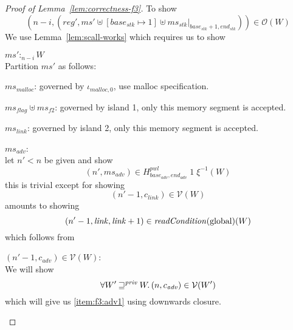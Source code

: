 \documentclass[a4paper]{article}
\newcommand{\var}[1]{\mathit{#1}}
\newcommand{\hs}{\var{ms}}
\newcommand{\ms}{\hs}
\newcommand{\start}{\var{base}}
\newcommand{\addrend}{\var{end}}
\newcommand{\reg}{\var{reg}}
\newcommand{\heap}{\var{mem}}
\newcommand{\adv}{\var{adv}}
\newcommand{\link}{\var{link}}
\newcommand{\stk}{\var{stk}}
\newcommand{\flag}{\var{flag}}
\newcommand{\pwl}{\var{pwl}}
\newcommand{\plainfun}[2]{
  \ifthenelse{\equal{#2}{}}
  {\mathit{#1}}
  {\mathit{#1}(#2)}
}
\newcommand{\readCond}[1]{\plainfun{readCondition}{#1}}
\newcommand{\futurestr}{\mathbin{\sqsupseteq}^{\var{priv}}}
\newcommand{\heapSat}[3][\heap]{#1 :_{#2} #3}
\newcommand{\memSat}[3][n]{\heapSat[#2]{#1}{#3}}
\newcommand{\codelabel}[1]{\mathit{#1}}
\newcommand{\malloc}{\codelabel{malloc}}
\newcommand{\asmType}{\plaindom{AsmType}}
\newcommand{\plaindom}[1]{\mathrm{#1}}
\newcommand{\intr}[2]{\mathcal{#1}}
\newcommand{\valueintr}[1]{\intr{V}{#1}}
\newcommand{\stdvr}{\valueintr{\asmType}}
\newcommand{\observations}{\mathcal{O}}
\newcommand{\npair}[2][n]{\left(#1,#2 \right)}
\newcommand{\plainperm}[1]{\mathrm{#1}}
\newcommand{\glob}{\plainperm{global}}
\begin{document}
\begin{proof}[Proof of Lemma~\ref{lem:correctness-f3}]
To show
\[
  \npair[n-i]{(\reg',\ms' \uplus [\start_\stk \mapsto 1] \uplus \ms_\stk |_{\start_\stk+1,\addrend_\stk})} \in \observations(W)
\]
We use Lemma~\ref{lem:scall-works} which requires us to show
\begin{enumproof}
  \item $\memSat[n-i]{\ms'}{W}$ \\
    Partition $\ms'$ as follows:
    \begin{enumproof}
      \item $\ms_\malloc$: governed by $\iota_{\malloc,0}$, use malloc specification.
      \item $\ms_\flag \uplus \ms_{f2}$: governed by island 1, only this memory segment is accepted.
      \item $\ms_\link$: governed by island 2, only this memory segment is accepted.
      \item $\ms_\adv$:\\
        let $n' < n$ be given and show
        \[
          \npair[n']{\ms_\adv} \in H^\pwl_{\start_\adv,\addrend_\adv}\;1\;\xi^{-1}(W)
        \]
        this is trivial except for showing
        \[
          \npair[n'-1]{c_\link} \in \stdvr(W)
        \]
        amounts to showing
        \[
          \npair[n'-1]{\link,\link+1} \in \readCond{}(\glob)(W)
        \]
        which follows from
        \begin{enumproof}
          \item $\npair[n'-1]{c_\adv} \in \stdvr(W)$: \label{item:f3:adv1}\\
            We will show
            \begin{equation}
              \label{eq:f3:adv-in-stder}
              \forall W' \futurestr W \ldotp \npair{c_\adv} \in \stdvr(W')
            \end{equation}
            which will give us \ref{item:f3:adv1} using downwards closure.


\end{enumproof}
\end{enumproof}
\end{enumproof}
\end{proof}
\end{document}

